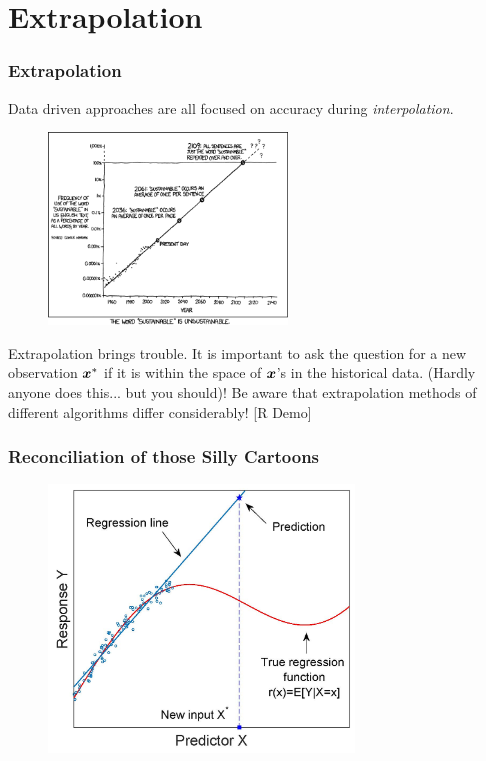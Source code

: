 \documentclass[slides]{beamer} %
\begin{document}
\section{Extrapolation}


\begin{frame}\frametitle{Extrapolation}
\small
Data driven approaches are all focused on accuracy during \emph{interpolation}.  

\begin{figure}
\centering
\includegraphics[width=2.5in]{extrap1.png}
\end{figure}
\vspace{-0.3cm}
Extrapolation brings trouble. It is important to ask the question for a new observation $\boldsymbol{x}^*$ if it is within the space of $\boldsymbol{x}$'s in the historical data. (Hardly anyone does this... but you should)! Be aware that extrapolation methods of different algorithms differ considerably! [R Demo]
	
\end{frame}

\begin{frame}\frametitle{Reconciliation of those Silly Cartoons}

\begin{figure}
\centering
\includegraphics[width=3.2in]{extrap.jpg}
\end{figure}

\end{frame}
\end{document}
